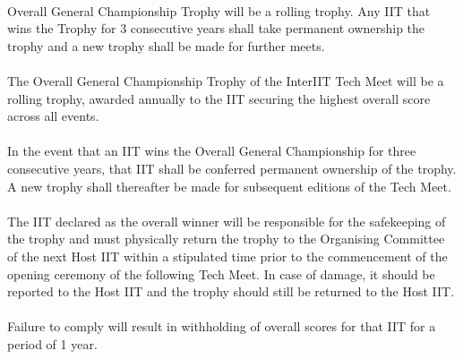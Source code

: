
\paragraph{}
Overall General Championship Trophy will be a rolling trophy. Any IIT that wins the Trophy for 3 consecutive years shall take permanent ownership the trophy and a new trophy shall be made for further meets.

\paragraph{}
The Overall General Championship Trophy of the InterIIT Tech Meet will be a rolling trophy, awarded annually to the IIT securing the highest overall score across all events.

\paragraph{}
In the event that an IIT wins the Overall General Championship for three consecutive years, that IIT shall be conferred permanent ownership of the trophy. A new trophy shall thereafter be made for subsequent editions of the Tech Meet.

\paragraph{}
The IIT declared as the overall winner will be responsible for the safekeeping of the trophy and must physically return the trophy to the Organising Committee of the next Host IIT within a stipulated time prior to the commencement of the opening ceremony of the following Tech Meet. In case of damage, it should be reported to the Host IIT and the trophy should still be returned to the Host IIT. 

\paragraph{}
Failure to comply will result in withholding of overall scores for that IIT for a period of 1 year.



